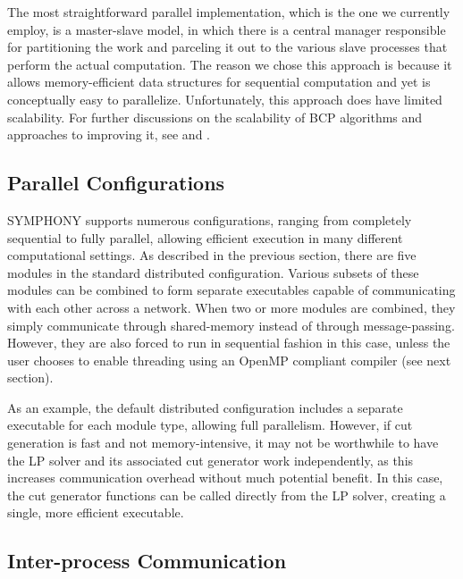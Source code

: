 The most straightforward parallel implementation, which is the one we
currently employ, is a master-slave model, in which there is a central
manager responsible for partitioning the work and parceling it out to
the various slave processes that perform the actual computation. The
reason we chose this approach is because it allows memory-efficient
data structures for sequential computation and yet is conceptually
easy to parallelize. Unfortunately, this approach does have limited
scalability. For further discussions on the scalability of BCP algorithms and
approaches to improving it, see \cite{symphony1} and \cite{ALPS}.


\subsection{Parallel Configurations}

SYMPHONY supports numerous configurations, ranging from completely
sequential to fully parallel, allowing efficient execution in many
different computational settings. As described in the previous
section, there are five modules in the standard distributed
configuration. Various subsets of these modules can be
combined to form separate executables capable of communicating
with each other across a network. When two or more modules are combined,
they simply communicate through shared-memory instead of through
message-passing. However, they are also forced to run in sequential
fashion in this case, unless the user chooses to enable threading
using an OpenMP compliant compiler (see next section). 

As an example, the default distributed configuration includes a
separate executable for each module type, allowing full parallelism.
However, if cut generation is fast and not memory-intensive,
it may not be worthwhile to have the LP solver and its associated cut
generator work independently, as this increases communication
overhead without much potential benefit. In this case, the cut
generator functions can be called directly from the LP solver,
creating a single, more efficient executable.

\subsection{Inter-process Communication}

